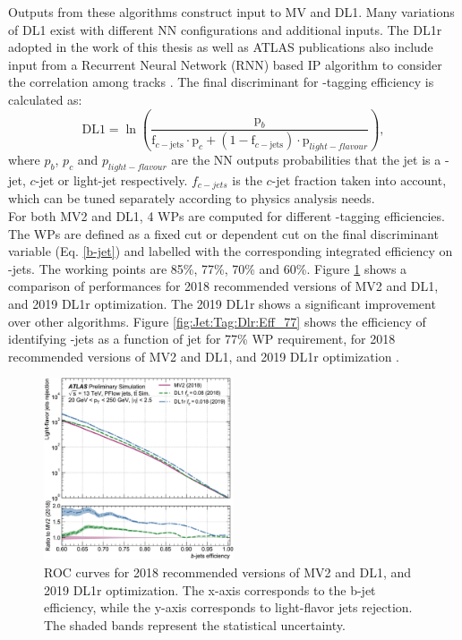 Outputs from these algorithms construct input to MV and DL1. Many variations of DL1 exist with different NN configurations and additional inputs. The DL1r adopted in the work of this thesis as well as ATLAS publications also include input from a Recurrent Neural Network (RNN) based IP algorithm to consider the correlation among tracks \cite{DL1r}. The final discriminant for \bq-tagging efficiency is calculated as:
\begin{equation}
    \mathrm{DL} 1=\ln \left(\frac{\mathrm{p}_{b}}{\mathrm{f}_{c-\mathrm{jets}} \cdot \mathrm{p}_{c}+\left(1-\mathrm{f}_{c-\mathrm{jets}}\right) \cdot \mathrm{p}_{light-flavour }}\right),
    \label{b-jet}
\end{equation}
where $p_b$, $p_c$ and $p_{light-flavour}$ are the NN outputs probabilities that the jet is a \bq-jet, $c$-jet or light-jet respectively. $f_{c-jets}$ is the $c$-jet fraction taken into account, which can be tuned separately according to physics analysis needs. \\  
For both MV2 and DL1, 4 WPs are computed for different \bq-tagging efficiencies. The WPs are defined as a fixed cut or \pT dependent cut on the final discriminant variable (Eq. \ref{b-jet}) and labelled with the corresponding integrated efficiency on \bq-jets. The working points are 85\%, 77\%, 70\% and 60\%. Figure \ref{fig:Jet:Tag:Dlr:Eff} shows a comparison of performances for 2018 recommended versions of MV2 and DL1, and 2019 DL1r optimization. The 2019 DL1r shows a significant improvement over other algorithms. Figure \ref{fig:Jet:Tag:Dlr:Eff_77} shows the efficiency of identifying \bq-jets as a function of jet \pT for 77\% WP requirement, for 2018 recommended versions of MV2 and DL1, and 2019 DL1r optimization \cite{Btag_Perf}. 
\begin{figure}[htbp]
    \centering
    \includegraphics[width=0.5\textwidth]{Ch4/Img/b_jet_Eff.png}
    \caption{ROC curves for 2018 recommended versions of MV2 and DL1, and 2019 DL1r optimization. The x-axis corresponds to the b-jet efficiency, while the y-axis corresponds to light-flavor jets rejection. The shaded bands represent the statistical uncertainty.}
    \label{fig:Jet:Tag:Dlr:Eff}
\end{figure}
